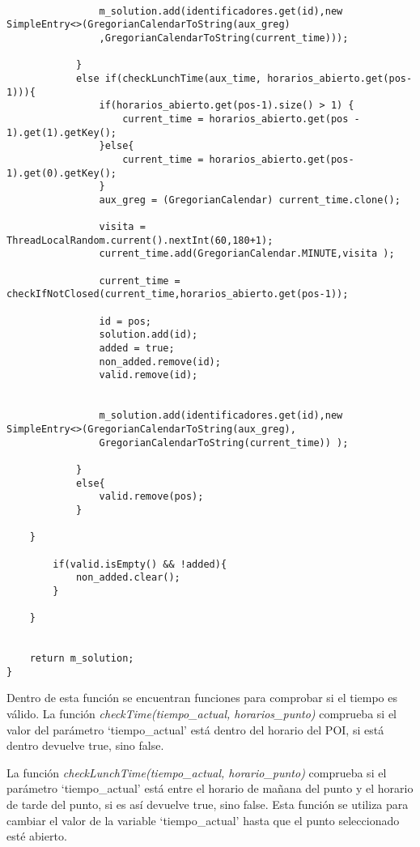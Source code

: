 \begin{lstlisting}[caption=Función para encontrar la ruta entre los puntos seleccionados.]
				
				m_solution.add(identificadores.get(id),new SimpleEntry<>(GregorianCalendarToString(aux_greg)
				,GregorianCalendarToString(current_time)));
						
			} 
			else if(checkLunchTime(aux_time, horarios_abierto.get(pos-1))){
				if(horarios_abierto.get(pos-1).size() > 1) {
					current_time = horarios_abierto.get(pos - 1).get(1).getKey();
				}else{ 
					current_time = horarios_abierto.get(pos-1).get(0).getKey();
				}
				aux_greg = (GregorianCalendar) current_time.clone();
				
				visita = ThreadLocalRandom.current().nextInt(60,180+1);
				current_time.add(GregorianCalendar.MINUTE,visita );
				
				current_time = checkIfNotClosed(current_time,horarios_abierto.get(pos-1));
				
				id = pos;
				solution.add(id);
				added = true;
				non_added.remove(id);
				valid.remove(id);
				
				
				m_solution.add(identificadores.get(id),new SimpleEntry<>(GregorianCalendarToString(aux_greg),
				GregorianCalendarToString(current_time)) );
			
			}
			else{
				valid.remove(pos);
			}
		
	}
	
		if(valid.isEmpty() && !added){
			non_added.clear();
		}
	
	}
	
	
	return m_solution;
}
\end{lstlisting}

Dentro de esta función se encuentran funciones para comprobar si el tiempo es válido. La función \textit{checkTime(tiempo\_actual, horarios\_punto)} comprueba si el valor del parámetro \enquote*{tiempo\_actual} está dentro del horario del POI, si está dentro devuelve true, sino false.\newline

La función \textit{checkLunchTime(tiempo\_actual, horario\_punto)} comprueba si el parámetro \enquote*{tiempo\_actual} está entre el horario de mañana del punto y el horario de tarde del punto, si es así devuelve true, sino false. Esta función se utiliza para cambiar el valor de la variable \enquote*{tiempo\_actual} hasta que el punto seleccionado esté abierto.

